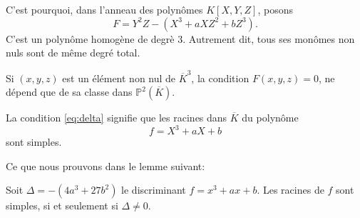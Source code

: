 C'est pourquoi, dans l'anneau des polynômes $K\left[ X,Y,Z \right] $, posons 
\[
F=Y^2Z-\left( X^3+aXZ^2+bZ^3 \right) 
.\] 
C'est un polynôme homogène de degrè $3$. Autrement dit, tous ses monômes non nuls sont de même degré total.

Si $(x,y,z)$ est un élément non nul de $\overline{K}^3$, la condition $F(x,y,z)=0$, ne dépend que de sa classe dans $\mathbb{P}^2(\overline{K})$.


La condition \eqref{eq:delta} signifie que les racines dans $\overline{K}$ du polynôme
\[
f=X^3+aX+b
\] 
sont simples.

Ce que nous prouvons dans le lemme suivant:

\begin{lemme}
    \label{lem:lemme1}
    Soit $\Delta= -(4a^3 + 27b^2)$ le discriminant $f = x^3 + ax + b$. 
    Les racines de $f$ sont simples, si et seulement si $\Delta \neq 0$.
\end{lemme}

